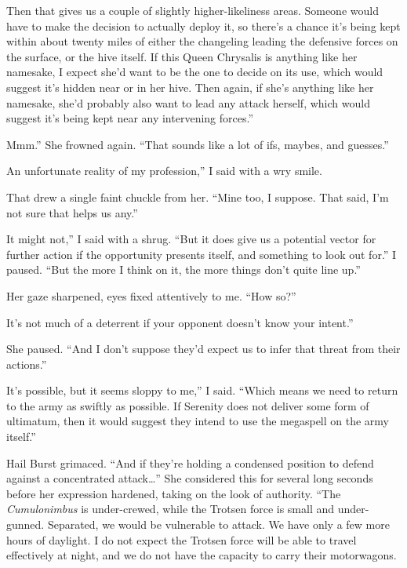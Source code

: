 \leavevmode{}Then that gives us a couple of slightly higher-likeliness areas. Someone would have to make the decision to actually deploy it, so there’s a chance it’s being kept within about twenty miles of either the changeling leading the defensive forces on the surface, or the hive itself. If this Queen Chrysalis is anything like her namesake, I expect she’d want to be the one to decide on its use, which would suggest it’s hidden near or in her hive. Then again, if she’s anything like her namesake, she’d probably also want to lead any attack herself, which would suggest it’s being kept near any intervening forces.”

\leavevmode{}Mmm.” She frowned again. “That sounds like a lot of ifs, maybes, and guesses.”

\leavevmode{}An unfortunate reality of my profession,” I said with a wry smile.

That drew a single faint chuckle from her. “Mine too, I suppose. That said, I’m not sure that helps us any.”

\leavevmode{}It might not,” I said with a shrug. “But it does give us a potential vector for further action if the opportunity presents itself, and something to look out for.” I paused. “But the more I think on it, the more things don’t quite line up.”

Her gaze sharpened, eyes fixed attentively to me. “How so?”

\leavevmode{}It’s not much of a deterrent if your opponent doesn’t know your intent.”

She paused. “And I don’t suppose they’d expect us to infer that threat from their actions.”

\leavevmode{}It’s possible, but it seems sloppy to me,” I said. “Which means we need to return to the army as swiftly as possible. If Serenity does not deliver some form of ultimatum, then it would suggest they intend to use the megaspell on the army itself.”

Hail Burst grimaced. “And if they’re holding a condensed position to defend against a concentrated attack…” She considered this for several long seconds before her expression hardened, taking on the look of authority. “The \textit{Cumulonimbus} is under-crewed, while the Trotsen force is small and under-gunned. Separated, we would be vulnerable to attack. We have only a few more hours of daylight. I do not expect the Trotsen force will be able to travel effectively at night, and we do not have the capacity to carry their motorwagons.

